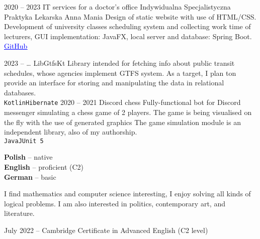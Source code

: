 \documentclass[8pt]{developercv} %
\begin{document}


\begin{entrylist}
  \entry
    {2020 -- 2023}
    {IT services for a doctor's office}
    {Indywidualna Specjalistyczna Praktyka Lekarska Anna Mania}
    {
      Design of static website with use of HTML/CSS.
      Development of university classes scheduling system and collecting work time of lecturers,
      GUI implementation: JavaFX, local server and database: Spring Boot.
      \href{https://github.com/pulkowski-jan/timetablescheduler}{
        \textcolor{blue}{\underline{GitHub}}
      }
    }
\end{entrylist}


\begin{entrylist}
  \entry
    {2023 -- \ldots}
    {LibGtfsKt}
    {}
    {
      Library intended for fetching info about public transit schedules, whose agencies implement GTFS system.
      As a target, I plan ton provide an interface for storing and manipulating the data in relational databases.
      \\\texttt{Kotlin}\slashsep\texttt{Hibernate}
    }
  \entry
    {2020 -- 2021}
    {Discord chess}
    {}
    {
      Fully-functional bot for Discord messenger simulating a chess game of 2 players.
      The game is being visualised on the fly with the use of generated graphics
      The game simulation module is an independent library, also of my authorship.
      \\\texttt{Java}\slashsep\texttt{JUnit 5}
    }
\end{entrylist}



\begin{minipage}[t]{0.3\textwidth}
  \vspace{-\baselineskip}


  \textbf{Polish} -- native\\
  \textbf{English} -- proficient (C2)\\
  \textbf{German} -- basic
\end{minipage}
\hfill
\begin{minipage}[t]{0.3\textwidth}
  \vspace{-\baselineskip}

  I find mathematics and computer science interesting,
  I enjoy solving all kinds of logical problems.
  I am also interested in politics, contemporary art, and literature.
\end{minipage}
\hfill
\begin{minipage}[t]{0.35\textwidth}
  \vspace{-\baselineskip}

  July 2022 -- Cambridge Certificate in Advanced English (C2 level)
\end{minipage}
\end{document}
